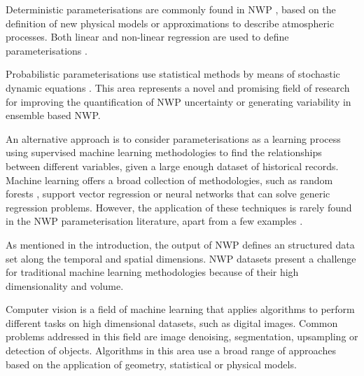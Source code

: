 \documentclass[twocol]{ametsoc}
\begin{document}
Deterministic parameterisations are commonly found in NWP \citep{kain2004kain,tiedtke1989comprehensive}, based on the definition of new physical models or approximations to describe atmospheric processes. Both linear and non-linear regression are used to define parameterisations \citep{crawford1999improved,feng20073}. 

Probabilistic parameterisations use statistical methods by means of stochastic dynamic equations \citep{berner2017stochastic}. This area represents a novel and promising field of research for improving the quantification of NWP uncertainty or generating variability in ensemble based NWP.

An alternative approach is to consider parameterisations as a learning process using supervised machine learning methodologies to find the relationships between different variables, given a large enough dataset of historical records. Machine learning offers a broad collection of methodologies, such as random forests \citep{breiman2001random}, support vector regression or neural networks that can solve generic regression problems. However, the application of these techniques is rarely found in the NWP parameterisation literature, apart from a few examples \citep{lipponen2013correction}.

As mentioned in the introduction, the output of NWP defines an structured data set along the temporal and spatial dimensions. NWP datasets present a challenge for traditional machine learning methodologies because of their high dimensionality and volume. 

Computer vision is a field of machine learning that applies algorithms to perform different tasks on high dimensional datasets, such as digital images. Common problems addressed in this field are image denoising, segmentation, upsampling or detection of objects. Algorithms in this area use a broad range of approaches based on the application of geometry, statistical or physical models. 
\end{document}
